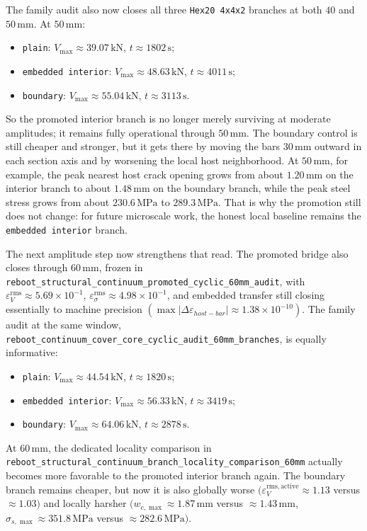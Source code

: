 The family audit also now closes all three \texttt{Hex20 4x4x2} branches at
both \(40\) and \(50\,\mathrm{mm}\). At \(50\,\mathrm{mm}\):
\begin{itemize}
  \item \texttt{plain}: \(V_{\max} \approx 39.07\,\mathrm{kN}\),
    \(t \approx 1802\,\mathrm{s}\);
  \item \texttt{embedded interior}: \(V_{\max} \approx 48.63\,\mathrm{kN}\),
    \(t \approx 4011\,\mathrm{s}\);
  \item \texttt{boundary}: \(V_{\max} \approx 55.04\,\mathrm{kN}\),
    \(t \approx 3113\,\mathrm{s}\).
\end{itemize}
So the promoted interior branch is no longer merely surviving at moderate
amplitudes; it remains fully operational through \(50\,\mathrm{mm}\). The
boundary control is still cheaper and stronger, but it gets there by moving
the bars \(30\,\mathrm{mm}\) outward in each section axis and by worsening the
local host neighborhood. At \(50\,\mathrm{mm}\), for example, the peak nearest
host crack opening grows from about \(1.20\,\mathrm{mm}\) on the interior
branch to about \(1.48\,\mathrm{mm}\) on the boundary branch, while the peak
steel stress grows from about \(230.6\,\mathrm{MPa}\) to
\(289.3\,\mathrm{MPa}\). That is why the promotion still does not change: for
future microscale work, the honest local baseline remains the
\texttt{embedded interior} branch.

The next amplitude step now strengthens that read. The promoted bridge also
closes through \(60\,\mathrm{mm}\), frozen in
\texttt{reboot\_structural\_continuum\_promoted\_cyclic\_60mm\_audit}, with
\(\varepsilon_V^{\mathrm{rms}} \approx 5.69\times10^{-1}\),
\(\varepsilon_\sigma^{\mathrm{rms}} \approx 4.98\times10^{-1}\), and embedded
transfer still closing essentially to machine precision
\((\max |\Delta \varepsilon_{host-bar}| \approx 1.38\times10^{-10})\). The
family audit at the same window,
\texttt{reboot\_continuum\_cover\_core\_cyclic\_audit\_60mm\_branches}, is
equally informative:
\begin{itemize}
  \item \texttt{plain}: \(V_{\max} \approx 44.54\,\mathrm{kN}\),
    \(t \approx 1820\,\mathrm{s}\);
  \item \texttt{embedded interior}: \(V_{\max} \approx 56.33\,\mathrm{kN}\),
    \(t \approx 3419\,\mathrm{s}\);
  \item \texttt{boundary}: \(V_{\max} \approx 64.06\,\mathrm{kN}\),
    \(t \approx 2878\,\mathrm{s}\).
\end{itemize}
At \(60\,\mathrm{mm}\), the dedicated locality comparison in
\texttt{reboot\_structural\_continuum\_branch\_locality\_comparison\_60mm}
actually becomes more favorable to the promoted interior branch again. The
boundary branch remains cheaper, but now it is also globally worse
\((\varepsilon_V^{\mathrm{rms,active}} \approx 1.13\) versus
\(\approx 1.03)\) and locally harsher
\((w_{c,\max} \approx 1.87\,\mathrm{mm}\) versus
\(\approx 1.43\,\mathrm{mm}\),
\(\sigma_{s,\max} \approx 351.8\,\mathrm{MPa}\) versus
\(\approx 282.6\,\mathrm{MPa})\).

